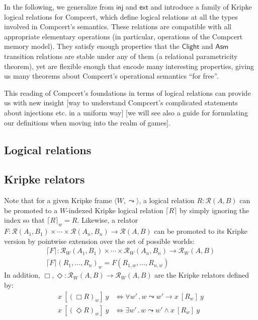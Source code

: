 \documentclass[acmsmall,anonymous]{acmart}
\newcommand{\kw}[1]{\ensuremath{ \textsf{#1} }}
\newcommand{\ifr}[1]{\ [{#1}]\ }
\begin{document}
In the following,
we generalize from \kw{inj} and \kw{ext} and
introduce a family of Kripke logical relations for Compcert,
which define logical relations at all the types
involved in Compcert's semantics.
These relations are compatible with
all appropriate elementary operations
(in particular, operations of the Compcert memory model).
They satisfy enough properties that
the \kw{Clight} and \kw{Asm} transition relations
are stable under any of them
(a relational parametricity theorem),
yet are flexible enough that encode many interesting properties,
giving us many theorems about Compcert's operational semantics
``for free''.

This reading of Compcert's foundations
in terms of logical relations
can provide us with new insight
[way to understand Compcert's complicated
statements about injections etc. in a uniform way]
[we will see also a guide for formulating our definitions
when moving into the realm of games].


\subsection{Logical relations}

\subsection{Kripke relators}

Note that for a given Kripke frame $\langle W, \leadsto \rangle$,
a logical relation $R : \mathcal{R}(A, B)$
can be promoted to a $W$-indexed Kripke logical relation $\lceil R \rceil$
by simply ignoring the index so that $\lceil R \rceil_w = R$.
Likewise,
a relator
  $F : \mathcal{R}(A_1, B_1) \times \cdots \times \mathcal{R}(A_n, B_n) \rightarrow \mathcal{R}(A, B)$
can be promoted to its Kripke version
by pointwise extension over the set of possible worlds:
\begin{gather*}
  \lceil F \rceil : \mathcal{R}_W(A_1, B_1) \times \cdots \times \mathcal{R}_W(A_n, B_n) \rightarrow \mathcal{R}_W(A, B) \\
  \lceil F \rceil (R_1, \ldots, R_n)_w = F(R_{1,w}, \ldots, R_{n,w})
\end{gather*}
In addition,
$\Box, \Diamond : \mathcal{R}_W(A,B) \rightarrow \mathcal{R}_W(A,B)$
are the Kripke relators defined by:
\begin{align*}
  x \ifr{(\Box R)_w} y &\Leftrightarrow
    \forall w' \,.\, w \leadsto w' \rightarrow x \ifr{R_w} y \\
  x \ifr{(\Diamond R)_w} y &\Leftrightarrow
    \exists w' \,.\, w \leadsto w' \wedge x \ifr{R_w} y
\end{align*}
\end{document}
